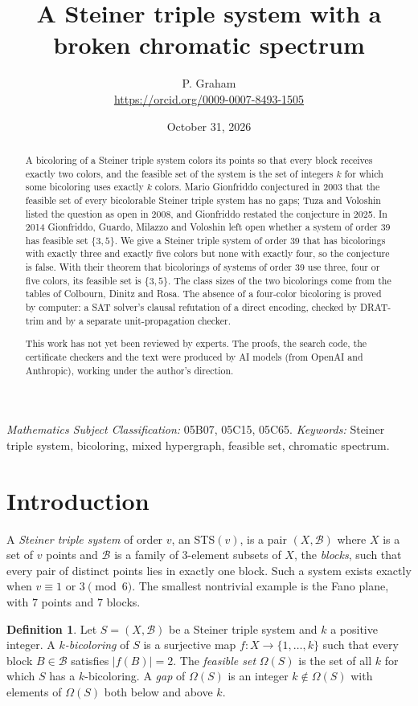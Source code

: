 \documentclass[11pt]{article}
\title{A Steiner triple system with a broken chromatic spectrum}
\author{P. Graham\\ \small\url{https://orcid.org/0009-0007-8493-1505}}
\date{October 31, 2026}
\theoremstyle{definition}
\newtheorem{definition}{Definition}
\begin{document}
\maketitle
\begin{abstract}
A bicoloring of a Steiner triple system colors its points so that every
block receives exactly two colors, and the feasible set of the system is
the set of integers $k$ for which some bicoloring uses exactly $k$ colors.
Mario Gionfriddo conjectured in 2003 that the feasible set of every
bicolorable Steiner triple system has no gaps; Tuza and Voloshin listed the
question as open in 2008, and Gionfriddo restated the conjecture in 2025.
In 2014 Gionfriddo, Guardo, Milazzo and Voloshin left open whether a
system of order 39 has feasible set $\{3,5\}$. We give a Steiner triple
system of order 39 that has bicolorings with exactly three and exactly
five colors but none with exactly four, so the conjecture is false. With
their theorem that bicolorings of systems of order 39 use three, four or
five colors, its feasible set is $\{3,5\}$. The class sizes of the two
bicolorings come from the tables of Colbourn, Dinitz and Rosa. The
absence of a four-color bicoloring is proved by computer: a SAT solver's
clausal refutation of a direct encoding, checked by DRAT-trim and by a
separate unit-propagation checker.

This work has not yet been reviewed by experts.
The proofs, the search code, the certificate checkers and the text were
produced by AI models (from OpenAI and Anthropic), working under the
author's direction.
\end{abstract}
\medskip

\noindent\textit{Mathematics Subject Classification:} 05B07, 05C15, 05C65.
\textit{Keywords:} Steiner triple system, bicoloring, mixed hypergraph,
feasible set, chromatic spectrum.

\section{Introduction}

A \emph{Steiner triple system} of order $v$, an STS$(v)$, is a pair
$(X,\mathcal{B})$ where $X$ is a set of $v$ points and $\mathcal{B}$ is a
family of $3$-element subsets of $X$, the \emph{blocks}, such that every
pair of distinct points lies in exactly one block. Such a system exists
exactly when $v\equiv 1$ or $3 \pmod 6$. The smallest nontrivial example is
the Fano plane, with $7$ points and $7$ blocks.

\begin{definition}
Let $S=(X,\mathcal{B})$ be a Steiner triple system and $k$ a positive
integer. A \emph{$k$-bicoloring} of $S$ is a surjective map
$f\colon X\to\{1,\dots,k\}$ such that every block $B\in\mathcal{B}$
satisfies $|f(B)|=2$. The \emph{feasible set} $\Omega(S)$ is the set of
all $k$ for which $S$ has a $k$-bicoloring. A \emph{gap} of $\Omega(S)$ is
an integer $k\notin\Omega(S)$ with elements of $\Omega(S)$ both below and
above $k$.
\end{definition}
\end{document}
